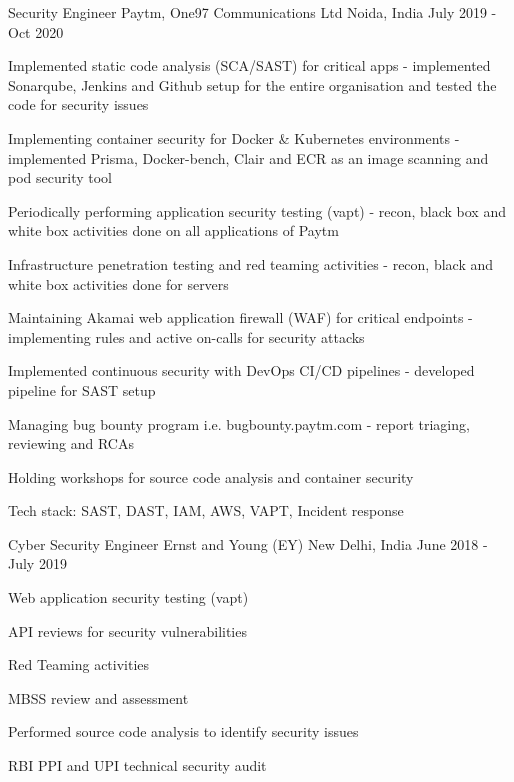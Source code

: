 \begin{cventries}
  \cventry
    {Security Engineer} %
    {Paytm, One97 Communications Ltd} %
    {Noida, India} %
    {July 2019 - Oct 2020} %
    {
      \begin{cvitems} %
        \item {Implemented static code analysis (SCA/SAST) for critical apps - implemented Sonarqube, Jenkins and Github setup for the entire organisation and tested the code for security issues}
        \item {Implementing container security for Docker \& Kubernetes environments - implemented Prisma, Docker-bench, Clair and ECR as an image scanning and pod security tool}
        \item {Periodically performing application security testing (vapt) - recon, black box and white box activities done on all applications of Paytm}
        \item {Infrastructure penetration testing and red teaming activities - recon, black and white box activities done for servers}
        \item {Maintaining Akamai web application firewall (WAF) for critical endpoints - implementing rules and active on-calls for security attacks}
        \item {Implemented continuous security with DevOps CI/CD pipelines - developed pipeline for SAST setup}
        \item {Managing bug bounty program i.e. bugbounty.paytm.com - report triaging, reviewing and RCAs}
        \item {Holding workshops for source code analysis and container security}
        \item {Tech stack: SAST, DAST, IAM, AWS, VAPT, Incident response}
      \end{cvitems}
    }

  \cventry
    {Cyber Security Engineer} %
    {Ernst and Young (EY)} %
    {New Delhi, India} %
    {June 2018 - July 2019} %
    {
      \begin{cvitems} %
        \item {Web application security testing (vapt)}
        \item {API reviews for security vulnerabilities}
        \item {Red Teaming activities}
        \item {MBSS review and assessment}
        \item {Performed source code analysis to identify security issues}
        \item {RBI PPI and UPI technical security audit}
      \end{cvitems}
    }


\end{cventries}
